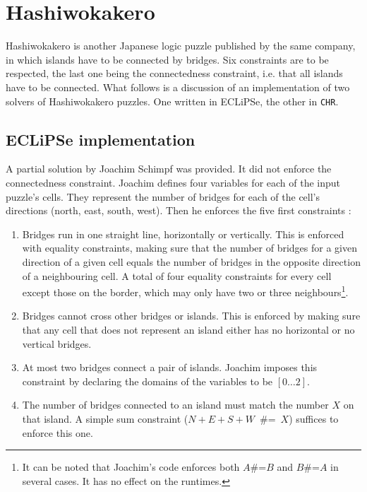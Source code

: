 \section{Hashiwokakero}

Hashiwokakero is another Japanese logic puzzle published by the same company, in which islands have to be connected by bridges. Six constraints are to be respected, the last one being the connectedness constraint, i.e. that all islands have to be connected. What follows is a discussion of an implementation of two solvers of Hashiwokakero puzzles. One written in ECLiPSe, the other in \texttt{CHR}.

\subsection{ECLiPSe implementation}

A partial solution by Joachim Schimpf was provided. It did not enforce the connectedness constraint. Joachim defines four variables for each of the input puzzle's cells. They represent the number of bridges for each of the cell's directions (north, east, south, west). Then he enforces the five first constraints :
\begin{enumerate}
\item[1-2.] Bridges run in one straight line, horizontally or vertically. This is enforced with equality constraints, making sure that the number of bridges for a given direction of a given cell equals the number of bridges in the opposite direction of a neighbouring cell. A total of four equality constraints for every cell except those on the border, which may only have two or three neighbours\footnote{It can be noted that Joachim's code enforces both $A$\#=$B$ and $B$\#=$A$ in several cases. It has no effect on the runtimes.}.
\item[3.] Bridges cannot cross other bridges or islands. This is enforced by making sure that any cell that does not represent an island either has no horizontal or no vertical bridges.
\item[4.] At most two bridges connect a pair of islands. Joachim imposes this constraint by declaring the domains of the variables to be $[0\dots 2]$.
\item[5.] The number of bridges connected to an island must match the number $X$ on that island. A simple sum constraint ($N+E+S+W$\ \#=\ $X$) suffices to enforce this one.
\end{enumerate}

